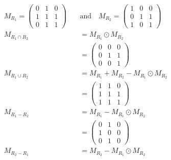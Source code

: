\documentclass{article}
\begin{document}
\[\begin{aligned}M_{{R_{1}}}=\begin{pmatrix}0&1&0\\1&1&1\\0&1&1\end{pmatrix}\quad & \mathrm{and}\quad M_{{R_{2}}}=\begin{pmatrix}1&0&0\\0&1&1\\1&0&1\end{pmatrix} \\
               M_{R_1\cap R_2}                                                  & = M_{R_1}\odot M_{R_2}                                                                                      \\
                                                                                & = \begin{pmatrix}0&0&0\\0&1&1\\0&0&1\end{pmatrix}                                            \\
               M_{R_1\cup R_2}                                                  & = M_{R_1} + M_{R_2} - M_{R_1}\odot M_{R_2}                                                                  \\
                                                                                & = \begin{pmatrix}1&1&0\\1&1&1\\1&1&1\end{pmatrix}                                            \\
               M_{R_1 - R_2}                                                    & = M_{R_1} - M_{R_1}\odot M_{R_2}                                                                            \\
                                                                                & = \begin{pmatrix}0&1&0\\1&0&0\\0&1&0\end{pmatrix}                                            \\
               M_{R_2 - R_1}                                                    & = M_{R_2} - M_{R_1}\odot M_{R_2}                                                                            \\

\end{aligned}\]
\end{document}
